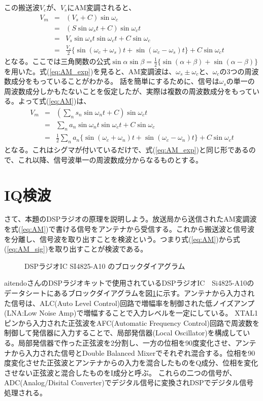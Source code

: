 この搬送波$V_c$が、$V_s$にAM変調されると、
\begin{eqnarray}
V_m &=& (V_s + C)\sin\omega_c \label{eq:AM}\\ 
&=&(S\sin\omega_s t + C)\sin\omega_c t \nonumber \\
&=& V_s\sin\omega_s t \sin\omega_c t + C\sin\omega_c \nonumber \\
&=& \frac{V_s}{2}\{\sin(\omega_c + \omega_s)t + \sin(\omega_c - \omega_s)t\} + C\sin\omega_ct \label{eq:AM_exp}
\end{eqnarray}
となる。ここでは三角関数の公式$\sin\alpha\sin\beta=\frac{1}{2}\{\sin(\alpha+\beta)+\sin(\alpha-\beta)\}$を用いた。式(\ref{eq:AM_exp})を見ると、AM変調波は、$\omega_s \pm \omega_c$と、$\omega_c$の3つの周波数成分をもっていることがわかる。
話を簡単にするために、信号は$\omega_s$の単一の周波数成分しかもたないことを仮定したが、実際は複数の周波数成分をもっている。よって式(\ref{eq:AM})は、
\begin{eqnarray}
V_m &=&  (\sum_n s_n\sin\omega_n t + C)\sin\omega_c t \nonumber \\
&=& \sum_n a_n\sin\omega_n t \sin\omega_c t + C\sin\omega_c \nonumber \\
&=& \frac{1}{2}\sum_n{a_n\{\sin(\omega_c + \omega_n)t + \sin(\omega_c - \omega_n)t}\} + C\sin\omega_ct \nonumber
\end{eqnarray}
となる。これはシグマが付いているだけで、式(\ref{eq:AM_exp})と同じ形であるので、これ以降、信号波単一の周波数成分からなるものとする。

\section*{IQ検波}
さて、本題のDSPラジオの原理を説明しよう。放送局から送信されたAM変調波を式(\ref{eq:AM})で書ける信号をアンテナから受信する。これから搬送波と信号波を分離し、信号波を取り出すことを検波という。つまり式(\ref{eq:AM})から式(\ref{eq:AM_sig})を取り出すことが検波である。

\begin{figure}
\caption{DSPラジオIC SI4825-A10 のブロックダイアグラム}
\label{fig:block}
\end{figure}
aitendoさんのDSPラジオキットで使用されているDSPラジオIC　Si4825-A10のデータシートにあるブロックダイアグラムを図\ref{fig:block}に示す。アンテナから入力された信号は、ALC(Auto Level Control)回路で増幅率を制御された低ノイズアンプ(LNA:Low Noise Amp)で増幅することで入力レベルを一定にしている。
XTAL1ピンから入力された正弦波をAFC(Automatic Frequency Control)回路で周波数を制御して発信器に入力することで、局部発信器(Local Oscillator)を構成している。局部発信器で作った正弦波を2分割し、一方の位相を90度変化させ、アンテナから入力された信号とDouble Balanced Mixerでそれぞれ混合する。位相を90度変化させた正弦波とアンテナからの入力を混合したものをQ成分、位相を変化させない正弦波と混合したものをI成分と呼ぶ。
これらの二つの信号が、ADC(Analog/Disital Converter)でデジタル信号に変換されDSPでデジタル信号処理される。

